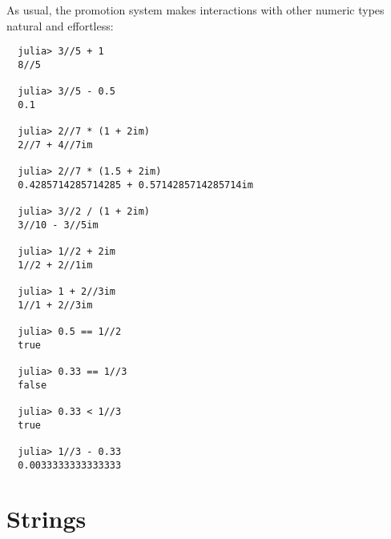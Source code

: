\documentclass{article}
\renewcommand{\sec}[1]{\label{sec:#1}}
\begin{document}
As usual, the promotion system makes interactions with other numeric types natural and effortless:
\begin{verbatim}
  julia> 3//5 + 1
  8//5

  julia> 3//5 - 0.5
  0.1

  julia> 2//7 * (1 + 2im)
  2//7 + 4//7im

  julia> 2//7 * (1.5 + 2im)
  0.4285714285714285 + 0.5714285714285714im

  julia> 3//2 / (1 + 2im)
  3//10 - 3//5im

  julia> 1//2 + 2im
  1//2 + 2//1im

  julia> 1 + 2//3im
  1//1 + 2//3im

  julia> 0.5 == 1//2
  true

  julia> 0.33 == 1//3
  false

  julia> 0.33 < 1//3
  true

  julia> 1//3 - 0.33
  0.0033333333333333
\end{verbatim}

\section{Strings}
\sec{strings}
\end{document}
